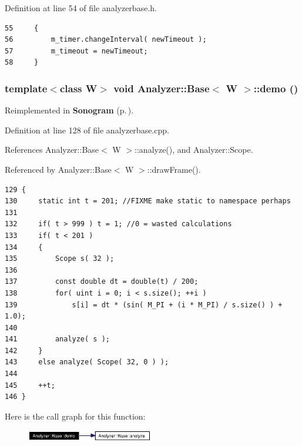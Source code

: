 Definition at line 54 of file analyzerbase.h.



\footnotesize\begin{verbatim}55     {
56         m_timer.changeInterval( newTimeout );
57         m_timeout = newTimeout;
58     }
\end{verbatim}\normalsize 
{}
\subsubsection{\setlength{\rightskip}{0pt plus 5cm}template$<$class W$>$ void {\bf Analyzer::Base}$<$ W $>$::demo ()\hspace{0.3cm}{\tt  [protected, virtual]}}\label{classAnalyzer_1_1Base_Analyzer_1_1Baseb5}




Reimplemented in {\bf Sonogram} {\rm (p.\,\pageref{classSonogram_Sonograma5})}.

Definition at line 128 of file analyzerbase.cpp.

References Analyzer::Base$<$ W $>$::analyze(), and Analyzer::Scope.

Referenced by Analyzer::Base$<$ W $>$::draw\-Frame().



\footnotesize\begin{verbatim}129 {
130     static int t = 201; //FIXME make static to namespace perhaps
131 
132     if( t > 999 ) t = 1; //0 = wasted calculations
133     if( t < 201 )
134     {
135         Scope s( 32 );
136 
137         const double dt = double(t) / 200;
138         for( uint i = 0; i < s.size(); ++i )
139             s[i] = dt * (sin( M_PI + (i * M_PI) / s.size() ) + 1.0);
140 
141         analyze( s );
142     }
143     else analyze( Scope( 32, 0 ) );
144 
145     ++t;
146 }
\end{verbatim}\normalsize 


Here is the call graph for this function:\begin{figure}[H]
\begin{center}
\leavevmode
\includegraphics[width=157pt]{classAnalyzer_1_1Base_Analyzer_1_1Baseb5_cgraph}
\end{center}
\end{figure}
